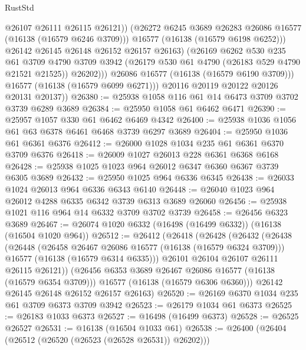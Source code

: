 \begin{lexlean}{RustStd}
\begin{coremodule}
                        @26107
                        @26111
                        @26115
                        @26121))
                    (@26272 @6245 @3689 @26283 @26086 @16577 (@16138 (@16579 @6246 @3709)))
                    @16577
                    (@16138 (@16579 @6198 @6252)))
                  @26142
                  @26145
                  @26148
                  @26152
                  @26157
                  @26163)
                (@26169
                  @6262
                  @530
                  @235
                  @61
                  @3709
                  @4790
                  @3709
                  @3942
                  (@26179 @530 @61 @4790 (@26183 @529 @4790 @21521 @21525))
                  @26202)))
            @26086
            @16577
            (@16138 (@16579 @6190 @3709)))
          @16577
          (@16138 (@16579 @6099 @6271)))
        @20116
        @20119
        @20122
        @20126
        @20131
        @20137))
@26380 := @25938 @1058 @116 @61 @14 @6473 @3709 @3702 @3739 @6289 @3689
@26384 := @25950 @1058 @61 @6462 @6471
@26390 := @25957 @1057 @330 @61 @6462 @6469 @4342
@26400 := @25938 @1036 @1056 @61 @63 @6378 @6461 @6468 @3739 @6297 @3689
@26404 := @25950 @1036 @61 @6361 @6376
@26412 := @26000 @1028 @1034 @235 @61 @6361 @6370 @3709 @6376
@26418 := @26009 @1027 @26013 @228 @6361 @6368 @6168
@26428 := @25938 @1025 @1023 @964 @26012 @6347 @6360 @6367 @3739 @6305 @3689
@26432 := @25950 @1025 @964 @6336 @6345
@26438 := @26033 @1024 @26013 @964 @6336 @6343 @6140
@26448 := @26040 @1023 @964 @26012 @4288 @6335 @6342 @3739 @6313 @3689 @26060
@26456 := @25938 @1021 @116 @964 @14 @6332 @3709 @3702 @3739
@26458 := @26456 @6323 @3689
@26467 := @26074 @1020 @6332 (@16498 (@16499 @6332)) (@16138 (@16504 @1020 @964))
@26512 := @26412
    (@26418
      (@26428
        (@26432
          (@26438
            (@26448
              (@26458 @26467 @26086 @16577 (@16138 (@16579 @6324 @3709)))
              @16577
              (@16138 (@16579 @6314 @6335)))
            @26101
            @26104
            @26107
            @26111
            @26115
            @26121))
        (@26456 @6353 @3689 @26467 @26086 @16577 (@16138 (@16579 @6354 @3709)))
        @16577
        (@16138 (@16579 @6306 @6360)))
      @26142
      @26145
      @26148
      @26152
      @26157
      @26163)
@26520 := @26169 @6370 @1034 @235 @61 @3709 @6373 @3709 @3942
@26523 := @26179 @1034 @61 @6373
@26525 := @26183 @1033 @6373
@26527 := @16498 (@16499 @6373)
@26528 := @26525 @26527
@26531 := @16138 (@16504 @1033 @61)
@26538 := @26400 (@26404 (@26512 (@26520 (@26523 (@26528 @26531)) @26202)))

\end{coremodule}
\end{lexlean}
